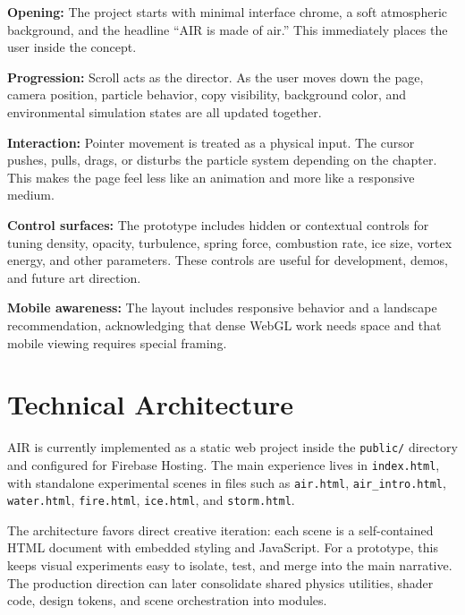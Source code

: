 \documentclass[11pt,a4paper]{article}
\newcommand{\sectionrule}{\vspace{0.2em}{\color{AirLine}\hrule height 0.8pt}\vspace{0.8em}}
\begin{document}
\textbf{Opening:} The project starts with minimal interface chrome, a soft atmospheric background, and the headline ``AIR is made of air.'' This immediately places the user inside the concept.

\textbf{Progression:} Scroll acts as the director. As the user moves down the page, camera position, particle behavior, copy visibility, background color, and environmental simulation states are all updated together.

\textbf{Interaction:} Pointer movement is treated as a physical input. The cursor pushes, pulls, drags, or disturbs the particle system depending on the chapter. This makes the page feel less like an animation and more like a responsive medium.

\textbf{Control surfaces:} The prototype includes hidden or contextual controls for tuning density, opacity, turbulence, spring force, combustion rate, ice size, vortex energy, and other parameters. These controls are useful for development, demos, and future art direction.

\textbf{Mobile awareness:} The layout includes responsive behavior and a landscape recommendation, acknowledging that dense WebGL work needs space and that mobile viewing requires special framing.

\section*{Technical Architecture}
\sectionrule

AIR is currently implemented as a static web project inside the \texttt{public/} directory and configured for Firebase Hosting. The main experience lives in \texttt{index.html}, with standalone experimental scenes in files such as \texttt{air.html}, \texttt{air\_intro.html}, \texttt{water.html}, \texttt{fire.html}, \texttt{ice.html}, and \texttt{storm.html}.

The architecture favors direct creative iteration: each scene is a self-contained HTML document with embedded styling and JavaScript. For a prototype, this keeps visual experiments easy to isolate, test, and merge into the main narrative. The production direction can later consolidate shared physics utilities, shader code, design tokens, and scene orchestration into modules.
\end{document}
